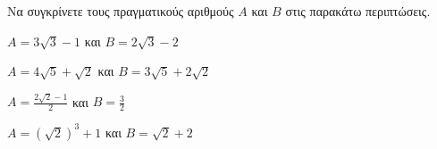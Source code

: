 Να συγκρίνετε τους πραγματικούς αριθμούς $ A $ και $ B $ στις παρακάτω περιπτώσεις.
\begin{alist}
\item $ A=3\sqrt{3}-1 $ και $ B=2\sqrt{3}-2 $
\item $ A=4\sqrt{5}+\sqrt{2} $ και $ B=3\sqrt{5}+2\sqrt{2} $
\item $ A=\frac{2\sqrt{2}-1}{2} $ και $ B=\frac{3}{2} $
\item $ A=\left(\!\sqrt{2}\right)^3+1 $ και $ B=\sqrt{2}+2 $
\end{alist}
